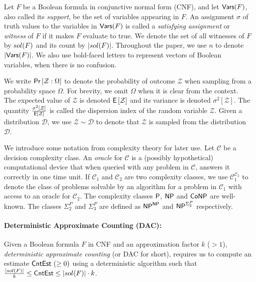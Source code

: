 
Let $F$ be a Boolean formula in conjunctive normal form (CNF), and let
$\mathsf{Vars }(F)$, also called its \emph{support}, be the set of variables
appearing in $F$.  An assignment $\sigma$ of truth values to the
variables in $\mathsf{Vars }(F)$ is called a \emph{satisfying assignment}
or \emph{witness} of $F$ if it makes $F$ evaluate to true.  We denote
the set of all witnesses of $F$ by $sol({F})$ and its count by
$|sol({F})|$. Throughout the paper, we use $n$ to denote $|\mathsf{Vars }(F)|$.
We also use bold-faced letters to represent vectors of Boolean
variables, when there is no confusion.

We write $\mathsf{Pr}\left[\mathcal{Z}: {\Omega} \right]$ to denote the
probability of outcome $\mathcal{Z}$ when sampling from a probability
space ${\Omega}$.  For brevity, we omit ${\Omega}$ when it is clear
from the context.  The expected value of $\mathcal{Z}$ is denoted
$\mathsf{E}\left[\mathcal{Z}\right]$ and its variance is denoted
$\sigma^2\left[\mathcal{Z}\right]$. The quantity
$\frac{ \sigma^2\left[\mathcal{Z}\right]}{\mathsf{E}\left[\mathcal{Z}\right]}$
is called the dispersion index of the random variable $\mathcal{Z}$.
Given a distribution $\mathcal{D}$, we use
$\mathcal{Z} \sim \mathcal{D}$ to denote that $\mathcal{Z}$ is sampled
from the distribution $\mathcal{D}$.




We introduce some notation from complexity theory for later use. Let
$\mathcal{C}$ be a decision complexity class.  An \emph{oracle} for
$\mathcal{C}$ is a (possibly hypothetical) computational device that
when queried with any problem in $\mathcal{C}$, answers it correctly
in one time unit.  If $\mathcal{C}_1$ and $\mathcal{C}_2$ are two
complexity classes, we use $\mathcal{C}_1^{\mathcal{C}_2}$ to denote
the class of problems solvable by an algorithm for a problem in
$\mathcal{C}_1$ with access to an oracle for $\mathcal{C}_2$.  The
complexity classes $\mathsf{P}$, $\mathsf{NP}$ and $\mathsf{CoNP}$ are well-known. The
classes $\Sigma_2^P$ and $\Sigma_3^P$ are defined as $\mathsf{NP}^{\mathsf{NP}}$ and
$\mathsf{NP}^{\Sigma_2^P}$ respectively.

\paragraph{\bfseries Deterministic Approximate Counting (DAC):}
Given a Boolean formula $F$ in CNF and an approximation factor $k$ ($> 1$), \emph{deterministic approximate
counting} (or DAC for short), requires us to compute an estimate
$\mathsf{CntEst}~(\geq 0)$ using a deterministic algorithm such that
$\frac{|sol({F})|}{k} \leq \mathsf{CntEst} \leq |sol({F})| \cdot k$.




